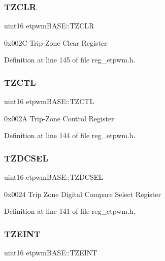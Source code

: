 \subsubsection{\texorpdfstring{T\+Z\+C\+LR}{TZCLR}}
{\footnotesize\ttfamily uint16 etpwm\+B\+A\+S\+E\+::\+T\+Z\+C\+LR}

0x002C Trip-\/\+Zone Clear Register 

Definition at line 145 of file reg\+\_\+etpwm.\+h.

\mbox{\label{structetpwmBASE_aeeb8de6322679e2f589c5eddc5c94456}} 
\subsubsection{\texorpdfstring{T\+Z\+C\+TL}{TZCTL}}
{\footnotesize\ttfamily uint16 etpwm\+B\+A\+S\+E\+::\+T\+Z\+C\+TL}

0x002A Trip-\/\+Zone Control Register 

Definition at line 144 of file reg\+\_\+etpwm.\+h.

\mbox{\label{structetpwmBASE_adaf1e351ca45ff307888679b0a4f0d17}} 
\subsubsection{\texorpdfstring{T\+Z\+D\+C\+S\+EL}{TZDCSEL}}
{\footnotesize\ttfamily uint16 etpwm\+B\+A\+S\+E\+::\+T\+Z\+D\+C\+S\+EL}

0x0024 Trip Zone Digital Compare Select Register 

Definition at line 141 of file reg\+\_\+etpwm.\+h.

\mbox{\label{structetpwmBASE_a36673d808f31abeaa78a07c66b0b95a9}} 
\subsubsection{\texorpdfstring{T\+Z\+E\+I\+NT}{TZEINT}}
{\footnotesize\ttfamily uint16 etpwm\+B\+A\+S\+E\+::\+T\+Z\+E\+I\+NT}

